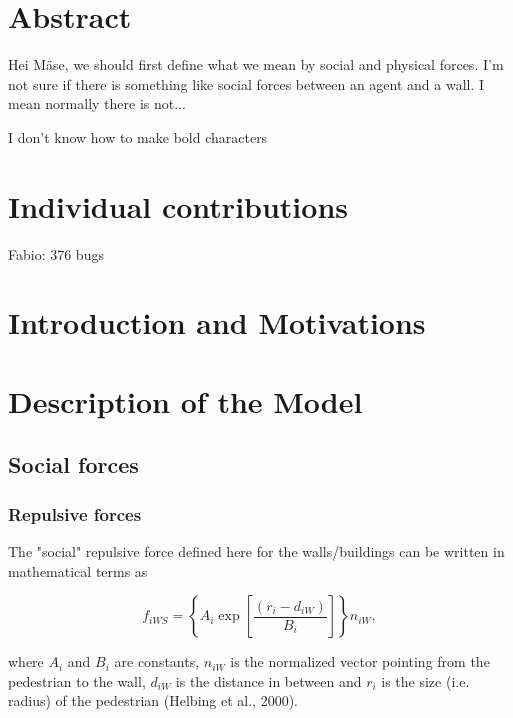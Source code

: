 \documentclass[11pt]{article}
\begin{document}
\newpage




\section{Abstract}

Hei M\"ase, we should first define what we mean by social and physical forces. I'm not sure if there is something like social forces between an agent and a wall. I mean normally there is not...

I don't know how to make bold characters

\section{Individual contributions}

Fabio: 376 bugs

\section{Introduction and Motivations}

\section{Description of the Model}

\subsection{Social forces}
\subsubsection{Repulsive forces}

The "social" repulsive force defined here for the walls/buildings can be written in mathematical terms as

\begin{equation}
	{f_{iWS}} = \left\{ {{A_i}\exp \left[ {\frac{{\left( {{r_i} - {d_{iW}}} \right)}}{{{B_i}}}} \right]} \right\}{n_{iW}} ,
	\label{eq:fiWS}
\end{equation}

where $A_i$ and $B_i$ are constants, $n_{iW}$ is the normalized vector pointing from the pedestrian to the wall, $d_{iW}$ is the distance in between and $r_i$ is the size (i.e. radius) of the pedestrian (Helbing et al., 2000).
\end{document}
